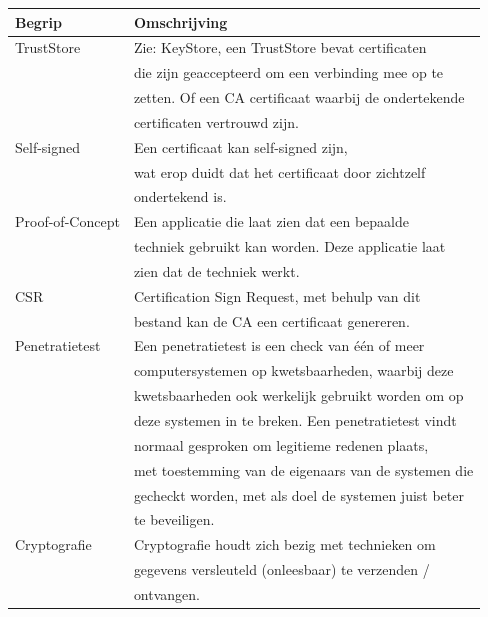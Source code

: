 \documentclass[]{article}
\begin{document}
\newpage
\begin{tabular}{|| l | l ||}\hline
    Begrip           & Omschrijving                                         \\\hline\hline
    TrustStore       & Zie: KeyStore, een TrustStore bevat certificaten     \\
                     & die zijn geaccepteerd om een verbinding mee op te    \\
                     & zetten. Of een CA certificaat waarbij de ondertekende\\
                     & certificaten vertrouwd  zijn.                        \\\hline
    Self-signed      & Een certificaat kan self-signed zijn,                \\
                     & wat erop duidt dat het certificaat door zichtzelf    \\
                     & ondertekend is.                                      \\\hline
    Proof-of-Concept & Een applicatie die laat zien dat een bepaalde        \\
                     & techniek gebruikt kan worden. Deze applicatie laat   \\
                     & zien dat de techniek werkt.                          \\\hline
    CSR              & Certification Sign Request, met behulp van dit       \\
                     & bestand kan de CA een certificaat genereren.         \\\hline
    Penetratietest   & Een penetratietest is een check van \'e\'en of meer  \\
                     & computersystemen op kwetsbaarheden, waarbij deze     \\
                     & kwetsbaarheden ook werkelijk gebruikt worden om op   \\
                     & deze systemen in te breken. Een penetratietest vindt \\
                     & normaal gesproken om legitieme redenen plaats,       \\
                     & met toestemming van de eigenaars van de systemen die \\
                     & gecheckt worden, met als doel de systemen juist beter\\
                     & te beveiligen.                                       \\\hline
    Cryptografie     & Cryptografie houdt zich bezig met technieken om      \\
                     & gegevens versleuteld (onleesbaar) te verzenden /     \\
                     & ontvangen.                                           \\\hline
\end{tabular}
\end{document}

